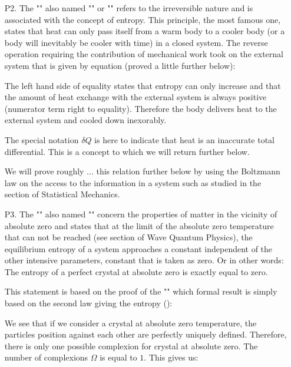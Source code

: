 \begin{enumerate}
		\item[P2.] The "" also named "" or "" refers to the irreversible nature and is associated with the concept of entropy. This principle, the most famous one, states that heat can only pass itself from a warm body to a cooler body (or a body will inevitably be cooler with time) in a closed system. The reverse operation requiring the contribution of mechanical work took on the external system that is given by equation (proved a little further below):
		
		The left hand side of equality states that entropy can only increase and that the amount of heat exchange with the external system is always positive (numerator term right to equality). Therefore the body delivers heat to the external system and cooled down inexorably.
		
		The special notation $\delta Q$ is here to indicate that heat is an inaccurate total differential. This is a concept to which we will return further below.
		\begin{tcolorbox}[title=Remark,colframe=black,arc=10pt]
		We will prove roughly ... this relation further below by using the Boltzmann law on the access to the information in a system such as studied in the section of Statistical Mechanics.
		\end{tcolorbox}

		\item[P3.] The "" also named "" concern the properties of matter in the vicinity of absolute zero and states that at the limit of the absolute zero temperature that can not be reached (see section of Wave Quantum Physics), the equilibrium entropy of a system approaches a constant independent of the other intensive parameters, constant that is taken as zero. Or in other words: The entropy of a perfect crystal at absolute zero is exactly equal to zero.
		\begin{dem}
		This statement is based on the proof of the "" which formal result is simply based on the second law giving the entropy ():
		
		We see that if we consider a crystal at absolute zero temperature, the particles position against each other are perfectly uniquely defined. Therefore, there is only one possible complexion for crystal at absolute zero. The number of complexions $\Omega$ is equal to $1$. This gives us:
		

\end{dem}
\end{enumerate}
